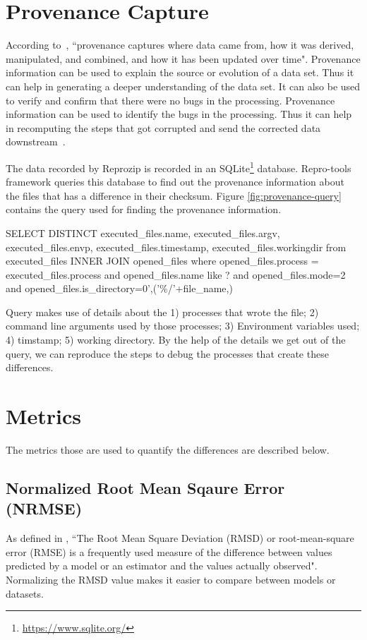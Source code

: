 \section{Provenance Capture}
According to~\cite{Ikeda:2010:PSP:1855795.1855800}, ``provenance captures where data came from, how it was derived, manipulated, and combined, and how it has been updated over time". Provenance information can be used to explain the source or evolution of a data set. Thus it can help in generating a deeper understanding of the data set. It can also be used to verify and confirm that there were no bugs in the processing. Provenance information can be used to identify the bugs in the processing. Thus it can help in recomputing the steps that got corrupted and send the corrected data downstream~\cite{Ikeda:2010:PSP:1855795.1855800}.

The data recorded by Reprozip is recorded in an SQLite\footnote{\url{https://www.sqlite.org/}} database. Repro-tools framework queries this database to find out the provenance information about the files that has a difference in their checksum. Figure \ref{fig:provenance-query} contains the query used for finding the provenance information.\\

\begin{tcolorbox}[colback=black!5!white,colframe=black!75!black]
SELECT DISTINCT executed\_files.name, executed\_files.argv, executed\_files.envp, executed\_files.timestamp, executed\_files.workingdir from executed\_files INNER JOIN opened\_files where opened\_files.process = executed\_files.process and opened\_files.name like ? and opened\_files.mode=2 and opened\_files.is\_directory=0',('\%/'+file\_name,)
\end{tcolorbox}
\label{fig:provenance-query}

Query makes use of details about the 1) processes that wrote the file; 2) command line arguments used by those processes; 3) Environment variables used; 4) timstamp; 5) working directory. By the help of the details we get out of the query, we can reproduce the steps to debug the processes that create these differences.

\section{Metrics} \label{sec:num1}
The metrics those are used to quantify the differences are described below.

\subsection{Normalized Root Mean Sqaure Error (NRMSE)}
As defined in \cite{khosrow2017handbook}, ``The Root Mean Square Deviation (RMSD) or root-mean-square error (RMSE) is a frequently used measure of the difference between values predicted by a model or an estimator and the values actually observed". Normalizing the RMSD value makes it easier to compare between models or datasets.


